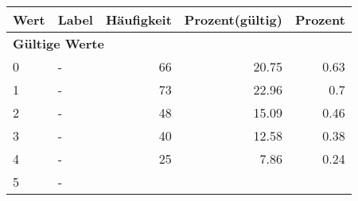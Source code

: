      \begin{longtable}{lXrrr}
     \toprule
     \textbf{Wert} & \textbf{Label} & \textbf{Häufigkeit} & \textbf{Prozent(gültig)} & \textbf{Prozent} \\
     \endhead
     \midrule
     \multicolumn{5}{l}{\textbf{Gültige Werte}}\\

     0 &
     \multicolumn{1}{X}{ -  } &


       \num{66} &
       \num[round-mode=places,round-precision=2]{20.75} &
         \num[round-mode=places,round-precision=2]{0.63} \\

     1 &
     \multicolumn{1}{X}{ -  } &


       \num{73} &
       \num[round-mode=places,round-precision=2]{22.96} &
         \num[round-mode=places,round-precision=2]{0.7} \\

     2 &
     \multicolumn{1}{X}{ -  } &


       \num{48} &
       \num[round-mode=places,round-precision=2]{15.09} &
         \num[round-mode=places,round-precision=2]{0.46} \\

     3 &
     \multicolumn{1}{X}{ -  } &


       \num{40} &
       \num[round-mode=places,round-precision=2]{12.58} &
         \num[round-mode=places,round-precision=2]{0.38} \\

     4 &
     \multicolumn{1}{X}{ -  } &


       \num{25} &
       \num[round-mode=places,round-precision=2]{7.86} &
         \num[round-mode=places,round-precision=2]{0.24} \\

     5 &
     \multicolumn{1}{X}{ -  } &



\end{longtable}
